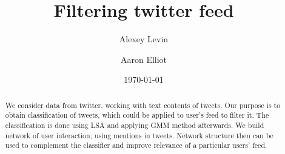 \documentclass[%
 reprint,
 amsmath,amssymb,
 aps,
]{revtex4-1}
\begin{document}

\title{Filtering twitter feed}%

\author{Alexey Levin}
\author{Aaron Elliot}%
%




\date{\today}%

\begin{abstract}


We consider data from twitter, working with text contents of tweets.
Our purpose is to obtain classification of tweets, which could be applied to user's feed to filter it.
The classification is done using LSA and applying GMM method afterwards.
We build network of user interaction, using mentions in tweets. Network structure then can be used to complement the classifier and improve relevance of a particular users' feed.



\end{abstract}
\end{document}
